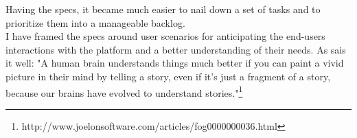 Having the specs, it became much easier to nail down a set of tasks and to prioritize them into a manageable backlog.\\

I have framed the specs around user scenarios for anticipating the end-users interactions with the platform and a better understanding of their needs. As  sais it well: "A human brain understands things much better if you can paint a vivid picture in their mind by telling a story, even if it's just a fragment of a story, because our brains have evolved to understand stories."\footnote{http://www.joelonsoftware.com/articles/fog0000000036.html}









